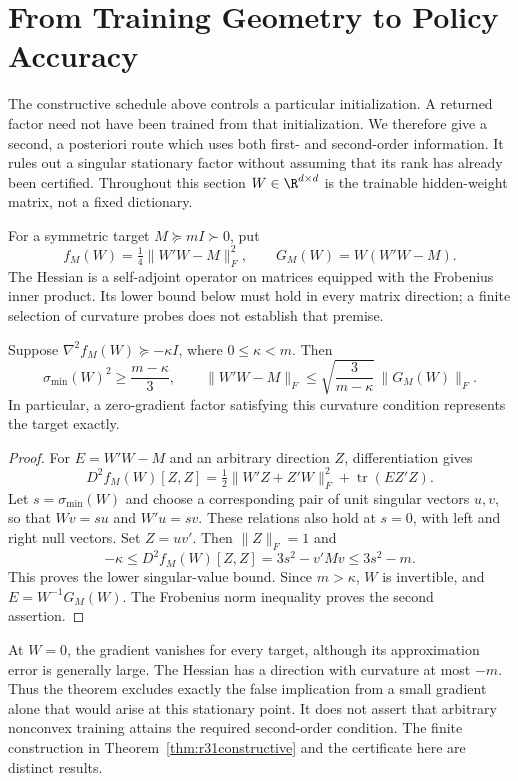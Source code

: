 \section{From Training Geometry to Policy Accuracy}\label{sec:r32geometry}
The constructive schedule above controls a particular initialization. A returned
factor need not have been trained from that initialization. We therefore give
a second, a posteriori route which uses both first- and second-order information.
It rules out a singular stationary factor without assuming that its rank has
already been certified. Throughout this section $W\in\R^{d\times d}$ is the
trainable hidden-weight matrix, not a fixed dictionary.

For a symmetric target $M\succeq mI\succ0$, put
\[
 f_M(W)=\tfrac14\|W'W-M\|_F^2,\qquad G_M(W)=W(W'W-M).
\]
The Hessian is a self-adjoint operator on matrices equipped with the Frobenius
inner product. Its lower bound below must hold in every matrix direction;
a finite selection of curvature probes does not establish that premise.

\begin{theorem}\label{thm:r32geometry}
Suppose $\nabla^2 f_M(W)\succeq-\kappa I$, where $0\leq\kappa<m$.
Then
\begin{equation}\label{eq:r32geometry}
 \sigma_{\min}(W)^2\geq\frac{m-\kappa}{3},\qquad
 \|W'W-M\|_F\leq
       \sqrt{\frac{3}{m-\kappa}}\,\|G_M(W)\|_F.
\end{equation}
In particular, a zero-gradient factor satisfying this curvature condition
represents the target exactly.
\end{theorem}
\begin{proof}
For $E=W'W-M$ and an arbitrary direction $Z$, differentiation gives
\[
 D^2f_M(W)[Z,Z]
   =\tfrac12\|W'Z+Z'W\|_F^2+\operatorname{tr}(E Z'Z).
\]
Let $s=\sigma_{\min}(W)$ and choose a corresponding pair of unit singular
vectors $u,v$, so that $Wv=su$ and $W'u=sv$. These relations also hold at
$s=0$, with left and right null vectors. Set $Z=uv'$. Then $\|Z\|_F=1$ and
\[
 -\kappa\leq D^2f_M(W)[Z,Z]=3s^2-v'Mv\leq3s^2-m.
\]
This proves the lower singular-value bound. Since $m>\kappa$, $W$ is
invertible, and $E=W^{-1}G_M(W)$. The Frobenius norm inequality proves the
second assertion.
\end{proof}

At $W=0$, the gradient vanishes for every target, although its approximation
error is generally large. The Hessian has a direction with curvature at most
$-m$. Thus the theorem excludes exactly the false implication from a small
gradient alone that would arise at this stationary point. It does not assert
that arbitrary nonconvex training attains the required second-order condition.
The finite construction in Theorem~\ref{thm:r31constructive} and the
certificate here are distinct results.

